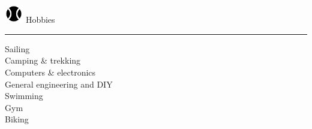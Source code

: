 \documentclass[10pt]{letter}
\begin{document}
    \includegraphics[width=0.8cm,height=0.8cm]{hobbies.png} {\fontsize{30pt}{30pt} \selectfont Hobbies}\\
    \hrule
    \large
     Sailing \\
     Camping \& trekking \\
     Computers \& electronics \\
     General engineering and DIY \\
     Swimming \\
     Gym \\
     Biking
    \normalsize
    \\[2\baselineskip]
\end{document}

